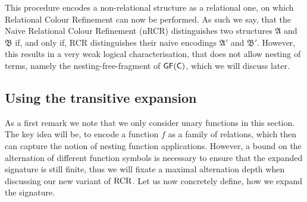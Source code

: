 This procedure encodes a non-relational structure as a relational one, on which Relational Colour Refinement can now be performed.
As such we say, that the Naive Relational Colour Refinement (nRCR) distinguishes two structures $\mathfrak A$ and $\mathfrak B$ if, and only if, RCR distinguishes their naive encodings $\mathfrak A'$ and $\mathfrak B'$.
However, this results in a very weak logical characterisation, that does not allow nesting of terms, namely the nesting-free-fragment of $\mathsf{GF}(\mathsf{C})$, which we will discuss later.

\subsection{Using the transitive expansion} 
\label{sec:TransitiveExpansion}

As a first remark we note that we only consider unary functions in this section.
The key idea will be, to encode a function $f$ as a family of relations, which then can capture the notion of nesting function applications.
However, a bound on the alternation of different function symbols is necessary to ensure that the expanded signature is still finite, thus we will fixate a maximal alternation depth when discussing our new variant of $\operatorname{RCR}$.
Let us now concretely define, how we expand the signature.

